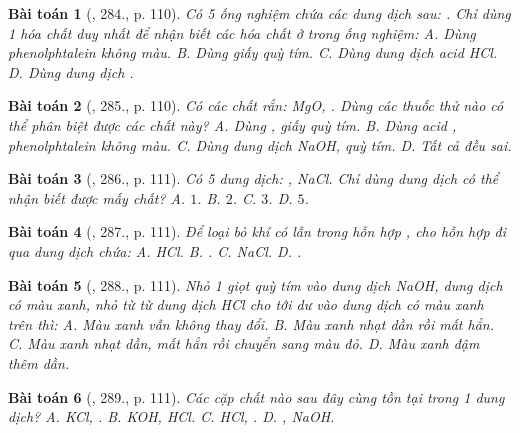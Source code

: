 \documentclass{article}
\newtheorem{baitoan}{Bài toán}
\begin{document}
\begin{baitoan}[\cite{Nguyen_Buu_Can_500_BT_Hoa_Hoc_THCS}, 284., p. 110]
	Có 5 ống nghiệm chứa các dung dịch sau: {\rm{}}. Chỉ dùng 1 hóa chất duy nhất để nhận biết các hóa chất ở trong ống nghiệm: {\sf A.} Dùng phenolphtalein không màu. {\sf B.} Dùng giấy quỳ tím. {\sf C.} Dùng dung dịch acid {\rm HCl}. {\sf D.} Dùng dung dịch {\rm{}}.
\end{baitoan}

\begin{baitoan}[\cite{Nguyen_Buu_Can_500_BT_Hoa_Hoc_THCS}, 285., p. 110]
	Có các chất rắn: {\rm MgO, }. Dùng các thuốc thử nào có thể phân biệt được các chất này? {\sf A.} Dùng {\rm{}}, giấy quỳ tím. {\sf B.} Dùng acid {\rm{}}, phenolphtalein không màu. {\sf C.} Dùng dung dịch {\rm NaOH}, quỳ tím. {\sf D.} Tất cả đều sai.
\end{baitoan}

\begin{baitoan}[\cite{Nguyen_Buu_Can_500_BT_Hoa_Hoc_THCS}, 286., p. 111]
	Có 5 dung dịch: {\rm{}, NaCl}. Chỉ dùng dung dịch {\rm{}} có thể nhận biết được mấy chất? {\sf A.} $1$. {\sf B.} $2$. {\sf C.} $3$. {\sf D.} $5$.
\end{baitoan}

\begin{baitoan}[\cite{Nguyen_Buu_Can_500_BT_Hoa_Hoc_THCS}, 287., p. 111]
	Để loại bỏ khí {\rm{}} có lẫn trong hỗn hợp {\rm{}}, cho hỗn hợp đi qua dung dịch chứa: {\rm{\sf A.} HCl. {\sf B.} . {\sf C.} NaCl. {\sf D.} }.
\end{baitoan}

\begin{baitoan}[\cite{Nguyen_Buu_Can_500_BT_Hoa_Hoc_THCS}, 288., p. 111]
	Nhỏ 1 giọt quỳ tím vào dung dịch {\rm NaOH}, dung dịch có màu xanh, nhỏ từ từ dung dịch {\rm HCl} cho tới dư vào dung dịch có màu xanh trên thì: {\sf A.} Màu xanh vẫn không thay đổi. {\sf B.} Màu xanh nhạt dần rồi mất hẳn. {\sf C.} Màu xanh nhạt dần, mất hẳn rồi chuyển sang màu đỏ. {\sf D.} Màu xanh đậm thêm dần.
\end{baitoan}

\begin{baitoan}[\cite{Nguyen_Buu_Can_500_BT_Hoa_Hoc_THCS}, 289., p. 111]
	Các cặp chất nào sau đây cùng tồn tại trong 1 dung dịch? {\rm{\sf A.} KCl, . {\sf B.} KOH, HCl. {\sf C.} HCl, . {\sf D.} , NaOH}.
\end{baitoan}
\end{document}

